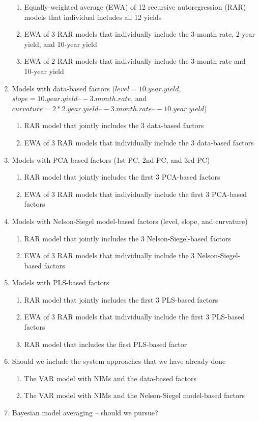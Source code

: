 \documentclass[11pt]{article}
\begin{document}
\begin{enumerate}
\begin{enumerate}
\item Equally-weighted average (EWA) of 12 recursive autoregression (RAR) models that individual includes all 12 yields 
\item EWA of 3 RAR models that individually include the 3-month rate, 2-year yield, and 10-year yield
\item EWA of 2 RAR models that individually include the 3-month rate and 10-year yield
\end{enumerate}
\item Models with data-based factors ($level=10.year.yield$, $slope=10.year.yield–-3.month.rate$, and $curvature=2*2.year.yield–-3.month.rate–-10.year.yield$)
\begin{enumerate}
\item RAR model that jointly includes the 3 data-based factors
\item EWA of 3 RAR models that individually include the 3 data-based factors
\end{enumerate}
\item Models with PCA-based factors (1st PC, 2nd PC, and 3rd PC)
\begin{enumerate}
\item RAR model that jointly includes the first 3 PCA-based factors
\item EWA of 3 RAR models that individually include the first 3 PCA-based factors
\end{enumerate}
\item Models with Nelson-Siegel model-based factors (level, slope, and curvature)
\begin{enumerate}
\item RAR model that jointly includes the 3 Nelson-Siegel-based factors
\item EWA of 3 RAR models that individually include the 3 Nelson-Siegel-based factors
\end{enumerate}
\item Models with PLS-based factors
\begin{enumerate}
\item RAR model that jointly includes the first 3 PLS-based factors
\item EWA of 3 RAR models that individually include the first 3 PLS-based factors
\item RAR model that includes the first PLS-based factor
\end{enumerate}
\item Should we include the system approaches that we have already done
\begin{enumerate}
\item The VAR model with NIMs and the data-based factors
\item The VAR model with NIMs and the Nelson-Siegel model-based factors
\end{enumerate}
\item Bayesian model averaging – should we pursue?
\end{enumerate}
\end{document}
